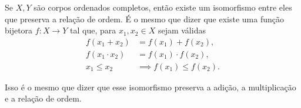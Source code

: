 \documentclass[../main.tex]{subfiles}
\begin{document}
\begin{teo}\label{enum-teo-RUnico}
    Se $X,Y$ são corpos ordenados completos, então existe um isomorfismo entre eles que preserva a relação de ordem. É o mesmo que dizer que existe uma função bijetora $f \colon X \to Y$ tal que, para $x_1,x_2 \in X$ sejam válidas
    \begin{align*}
         f(x_1 + x_2) &= f(x_1) + f(x_2) , \\
         f(x_1 \cdot x_2) &= f(x_1) \cdot f(x_2) , \\
         x_1 \leq x_2 &\implies f(x_1) \leq f(x_2).
    \end{align*}
\end{teo}
\begin{obs}
    Isso é o mesmo que dizer que esse isomorfismo preserva a adição, a multiplicação e a relação de ordem.
\end{obs}
\end{document}
